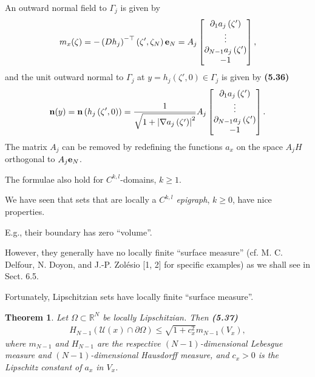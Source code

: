 \documentclass{book}
\numberwithin{equation}{section}
\newtheorem{theorem}{Theorem}[section]
\begin{document}
\begin{enumerate}
\begin{enumerate}
        An outward normal field to $\Gamma_j$ is given by
        \begin{align*}
            m_x(\zeta) = -\left(Dh_j\right)^{-\top}\left(\zeta',\zeta_N\right){\bf e}_N = A_j\begin{bmatrix}
                \partial_1a_j\left(\zeta'\right)\\ \vdots\\ \partial_{N - 1}a_j\left(\zeta'\right)\\ -1
            \end{bmatrix},
        \end{align*}
        and the unit outward normal to $\Gamma_j$ at $y = h_j\left(\zeta',0\right)\in\Gamma_j$ is given by \textbf{(5.36)}
        \begin{align*}
            {\bf n}(y) = {\bf n}\left(h_j\left(\zeta',0\right)\right) = \frac{1}{\sqrt{1 + \left|\nabla a_j\left(\zeta'\right)\right|^2}}A_j\begin{bmatrix}
                \partial_1a_j\left(\zeta'\right)\\ \vdots\\ \partial_{N - 1}a_j\left(\zeta'\right)\\ -1
            \end{bmatrix}.
        \end{align*}
        The matrix $A_j$ can be removed by redefining the functions $a_x$ on the space $A_jH$ orthogonal to $A_j{\bf e}_N$.
        
        The formulae also hold for $C^{k,l}$-domains, $k\ge 1$.
        
        We have seen that sets that are locally a \textit{$C^{k,l}$ epigraph}, $k\ge 0$, have nice properties.
        
        E.g., their boundary has zero ``volume''.
        
        However, they generally have no locally finite ``surface measure'' (cf. M. C. Delfour, N. Doyon, and J.-P. Zolésio [1, 2] for specific examples) as we shall see in Sect. 6.5.
        
        Fortunately, Lipschitzian sets have locally finite ``surface measure''.
        
        \begin{theorem}
            Let $\Omega\subset\mathbb{R}^N$ be locally Lipschitzian. Then \textbf{(5.37)}
            \begin{align*}
                H_{N - 1}\left(\mathcal{U}(x)\cap\partial\Omega\right)\le\sqrt{1 + c_x^2}m_{N - 1}\left(V_x\right),
            \end{align*}
            where $m_{N-1}$ and $H_{N-1}$ are the respective $(N - 1)$-dimensional Lebesgue measure and $(N - 1)$-dimensional Hausdorff measure, and $c_x > 0$ is the Lipschitz constant of $a_x$ in $V_x$.
            

\end{theorem}
\end{enumerate}
\end{enumerate}
\end{document}
